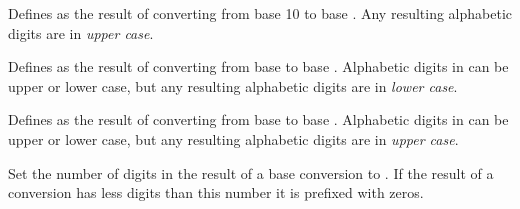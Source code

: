 \begin{command}{\pgfmathdectoBase{}}
	Defines  as the result of converting  from
	base 10 to base . Any resulting alphabetic digits are in
	\emph{upper case}.

\begin{codeexample}[]
\pgfmathdectoBase{} \mynumber
\end{codeexample}

\end{command}

\begin{command}{\pgfmathbasetobase{}}
	Defines  as the result of converting  from
	base  to base . Alphabetic digits in
	 can be upper or lower case, but any resulting
	alphabetic digits are in \emph{lower case}.

\begin{codeexample}[]
\pgfmathbasetobase{} \mynumber
\end{codeexample}

\end{command}

\begin{command}{\pgfmathbasetoBase{}}
	Defines  as the result of converting  from
	base  to base . Alphabetic digits in
	 can be upper or lower case, but any resulting
	alphabetic digits are in \emph{upper case}.

\begin{codeexample}[]
\pgfmathbasetoBase{} \mynumber
\end{codeexample}

\end{command}


\begin{command}{\pgfmathsetbasenumberlength{}}
	Set the number of digits in the result of a base conversion to
	. If the result of a conversion has less digits
	than this number it is prefixed with zeros.

\begin{codeexample}[]
\pgfmathdectobase{} \mynumber
\end{codeexample}

\end{command}
